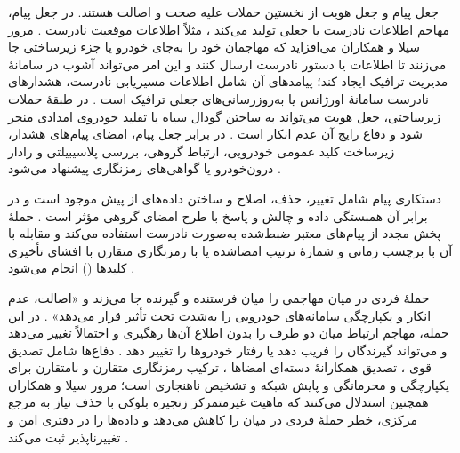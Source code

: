 \documentclass[12pt,a4paper]{article}
\begin{document}
جعل پیام  و جعل هویت  از نخستین حملات علیه صحت و اصالت هستند. در جعل پیام، مهاجم اطلاعات نادرست یا جعلی تولید می‌کند \cite{farsimadanReviewSecurityChallenges2025}، مثلاً اطلاعات موقعیت نادرست \cite{farsimadanReviewSecurityChallenges2025}. مرور سیلا و همکاران می‌افزاید که مهاجمان خود را به‌جای خودرو یا جزء زیرساختی جا می‌زنند تا اطلاعات یا دستور نادرست ارسال کنند و این امر می‌تواند آشوب در سامانهٔ مدیریت ترافیک ایجاد کند؛ پیامد‌های آن شامل اطلاعات مسیریابی نادرست، هشدار‌های نادرست سامانهٔ اورژانس یا به‌روزرسانی‌های جعلی ترافیک است \cite{VanetSecurityPrivacy}. در طبقهٔ حملات زیرساختی، جعل هویت می‌تواند به ساختن گودال سیاه یا تقلید خودروی امدادی منجر شود و دفاع رایج آن عدم انکار است \cite{farsimadanReviewSecurityChallenges2025}. در برابر جعل پیام، امضای پیام‌های هشدار، زیرساخت کلید عمومی خودرویی، ارتباط گروهی، بررسی پلاسیبیلتی و رادار درون‌خودرو یا گواهی‌های رمزنگاری پیشنهاد می‌شود \cite{farsimadanReviewSecurityChallenges2025}.

دستکاری پیام  شامل تغییر، حذف، اصلاح و ساختن داده‌های از پیش موجود است \cite{farsimadanReviewSecurityChallenges2025} و در برابر آن همبستگی داده و چالش و پاسخ با طرح امضای گروهی مؤثر است \cite{farsimadanReviewSecurityChallenges2025}. حملهٔ پخش مجدد  از پیام‌های معتبر ضبط‌شده به‌صورت نادرست استفاده می‌کند و مقابله با آن با برچسب زمانی و شمارهٔ ترتیب امضاشده \cite{farsimadanReviewSecurityChallenges2025} یا با رمزنگاری متقارن با افشای تأخیری کلید‌ها () انجام می‌شود \cite{farsimadanReviewSecurityChallenges2025}.

حملهٔ فردی در میان  مهاجمی را میان فرستنده و گیرنده جا می‌زند و «اصالت، عدم انکار و یکپارچگی سامانه‌های خودرویی را به‌شدت تحت تأثیر قرار می‌دهد» \cite{farsimadanReviewSecurityChallenges2025}. در این حمله، مهاجم ارتباط میان دو طرف را بدون اطلاع آن‌ها رهگیری و احتمالاً تغییر می‌دهد و می‌تواند گیرندگان را فریب دهد یا رفتار خودرو‌ها را تغییر دهد \cite{VanetSecurityPrivacy}. دفاع‌ها شامل تصدیق قوی \cite{farsimadanReviewSecurityChallenges2025}، تصدیق همکارانهٔ دسته‌ای امضا‌ها \cite{farsimadanReviewSecurityChallenges2025}، ترکیب رمزنگاری متقارن و نامتقارن برای یکپارچگی و محرمانگی \cite{VanetSecurityPrivacy} و پایش شبکه و تشخیص ناهنجاری است؛ مرور سیلا و همکاران همچنین استدلال می‌کنند که ماهیت غیرمتمرکز زنجیره بلوکی با حذف نیاز به مرجع مرکزی، خطر حملهٔ فردی در میان را کاهش می‌دهد و داده‌ها را در دفتری امن و تغییرناپذیر ثبت می‌کند \cite{VanetSecurityPrivacy}.
\end{document}
